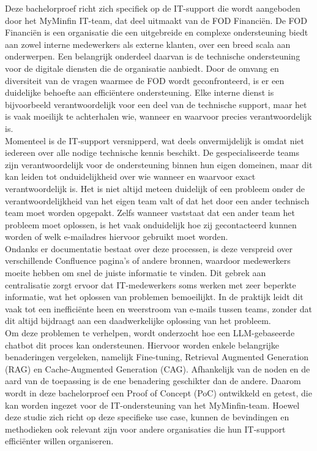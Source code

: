 Deze bachelorproef richt zich specifiek op de IT-support die wordt aangeboden door het MyMinfin IT-team, dat deel uitmaakt van de FOD Financiën. De FOD Financiën is een organisatie die een uitgebreide en complexe ondersteuning biedt aan zowel interne medewerkers als externe klanten, over een breed scala aan onderwerpen. Een belangrijk onderdeel daarvan is de technische ondersteuning voor de digitale diensten die de organisatie aanbiedt. Door de omvang en diversiteit van de vragen waarmee de FOD wordt geconfronteerd, is er een duidelijke behoefte aan efficiëntere ondersteuning. Elke interne dienst is bijvoorbeeld verantwoordelijk voor een deel van de technische support, maar het is vaak moeilijk te achterhalen wie, wanneer en waarvoor precies verantwoordelijk is.
\\[1em]
Momenteel is de IT-support versnipperd, wat deels onvermijdelijk is omdat niet iedereen over alle nodige technische kennis beschikt. De gespecialiseerde teams zijn verantwoordelijk voor de ondersteuning binnen hun eigen domeinen, maar dit kan leiden tot onduidelijkheid over wie wanneer en waarvoor exact verantwoordelijk is. Het is niet altijd meteen duidelijk of een probleem onder de verantwoordelijkheid van het eigen team valt of dat het door een ander technisch team moet worden opgepakt. Zelfs wanneer vaststaat dat een ander team het probleem moet oplossen, is het vaak onduidelijk hoe zij gecontacteerd kunnen worden of welk e-mailadres hiervoor gebruikt moet worden.
\\[1em]
Ondanks er documentatie bestaat over deze processen, is deze verspreid over verschillende Confluence pagina’s of andere bronnen, waardoor medewerkers moeite hebben om snel de juiste informatie te vinden. Dit gebrek aan centralisatie zorgt ervoor dat IT-medewerkers soms werken met zeer beperkte informatie, wat het oplossen van problemen bemoeilijkt. In de praktijk leidt dit vaak tot een inefficiënte heen en weerstroom van e-mails tussen teams, zonder dat dit altijd bijdraagt aan een daadwerkelijke oplossing van het probleem.
\\[1em]
Om deze problemen te verhelpen, wordt onderzocht hoe een LLM-gebaseerde chatbot dit proces kan ondersteunen. Hiervoor worden enkele belangrijke benaderingen vergeleken, namelijk Fine-tuning, Retrieval Augmented Generation (RAG) en Cache-Augmented Generation (CAG). Afhankelijk van de noden en de aard van de toepassing is de ene benadering geschikter dan de andere. Daarom wordt in deze bachelorproef een Proof of Concept (PoC) ontwikkeld en getest, die kan worden ingezet voor de IT-ondersteuning van het MyMinfin-team. Hoewel deze studie zich richt op deze specifieke use case, kunnen de bevindingen en methodieken ook relevant zijn voor andere organisaties die hun IT-support efficiënter willen organiseren.

